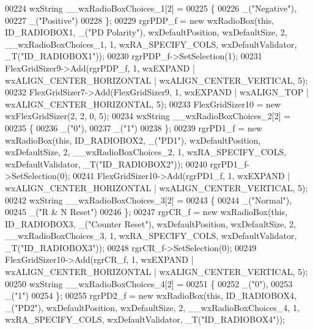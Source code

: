 \begin{DoxyCode}
00224     wxString \_\_wxRadioBoxChoices\_1[2] =
00225     \{
00226         \_(\textcolor{stringliteral}{"Negative"}),
00227         \_(\textcolor{stringliteral}{"Positive"})
00228     \};
00229     rgrPDP\_f = \textcolor{keyword}{new} wxRadioBox(\textcolor{keyword}{this}, ID\_RADIOBOX1, \_(\textcolor{stringliteral}{"PD Polarity"}), wxDefaultPosition, wxDefaultSize, 2, 
      \_\_wxRadioBoxChoices\_1, 1, wxRA\_SPECIFY\_COLS, wxDefaultValidator, _T(\textcolor{stringliteral}{"ID\_RADIOBOX1"}));
00230     rgrPDP\_f->SetSelection(1);
00231     FlexGridSizer9->Add(rgrPDP\_f, 1, wxEXPAND | wxALIGN\_CENTER\_HORIZONTAL | wxALIGN\_CENTER\_VERTICAL, 5);
00232     FlexGridSizer7->Add(FlexGridSizer9, 1, wxEXPAND | wxALIGN\_TOP | wxALIGN\_CENTER\_HORIZONTAL, 5);
00233     FlexGridSizer10 = \textcolor{keyword}{new} wxFlexGridSizer(2, 2, 0, 5);
00234     wxString \_\_wxRadioBoxChoices\_2[2] =
00235     \{
00236         \_(\textcolor{stringliteral}{"0"}),
00237         \_(\textcolor{stringliteral}{"1"})
00238     \};
00239     rgrPD1\_f = \textcolor{keyword}{new} wxRadioBox(\textcolor{keyword}{this}, ID\_RADIOBOX2, \_(\textcolor{stringliteral}{"PD1"}), wxDefaultPosition, wxDefaultSize, 2, 
      \_\_wxRadioBoxChoices\_2, 1, wxRA\_SPECIFY\_COLS, wxDefaultValidator, _T(\textcolor{stringliteral}{"ID\_RADIOBOX2"}));
00240     rgrPD1\_f->SetSelection(0);
00241     FlexGridSizer10->Add(rgrPD1\_f, 1, wxEXPAND | wxALIGN\_CENTER\_HORIZONTAL | wxALIGN\_CENTER\_VERTICAL, 5);
00242     wxString \_\_wxRadioBoxChoices\_3[2] =
00243     \{
00244         \_(\textcolor{stringliteral}{"Normal"}),
00245         \_(\textcolor{stringliteral}{"R & N Reset"})
00246     \};
00247     rgrCR\_f = \textcolor{keyword}{new} wxRadioBox(\textcolor{keyword}{this}, ID\_RADIOBOX3, \_(\textcolor{stringliteral}{"Counter Reset"}), wxDefaultPosition, wxDefaultSize, 2, 
      \_\_wxRadioBoxChoices\_3, 1, wxRA\_SPECIFY\_COLS, wxDefaultValidator, _T(\textcolor{stringliteral}{"ID\_RADIOBOX3"}));
00248     rgrCR\_f->SetSelection(0);
00249     FlexGridSizer10->Add(rgrCR\_f, 1, wxEXPAND | wxALIGN\_CENTER\_HORIZONTAL | wxALIGN\_CENTER\_VERTICAL, 5);
00250     wxString \_\_wxRadioBoxChoices\_4[2] =
00251     \{
00252         \_(\textcolor{stringliteral}{"0"}),
00253         \_(\textcolor{stringliteral}{"1"})
00254     \};
00255     rgrPD2\_f = \textcolor{keyword}{new} wxRadioBox(\textcolor{keyword}{this}, ID\_RADIOBOX4, \_(\textcolor{stringliteral}{"PD2"}), wxDefaultPosition, wxDefaultSize, 2, 
      \_\_wxRadioBoxChoices\_4, 1, wxRA\_SPECIFY\_COLS, wxDefaultValidator, _T(\textcolor{stringliteral}{"ID\_RADIOBOX4"}));

\end{DoxyCode}
